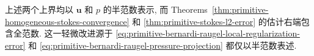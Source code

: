 \setcounter{statement}{1}
\begin{Remark}\label{rem:primitive-bernardi-raugel-seminorm-estimates}
上述两个上界均以 $\mathbf u$ 和 $p$ 的半范数表示, 而
Theorems~\ref{thm:primitive-homogeneous-stokes-convergence} 和
\ref{thm:primitive-stokes-l2-error} 的估计右端包含全范数.
这一轻微改进源于 \eqref{eq:primitive-bernardi-raugel-local-regularization-error}
和 \eqref{eq:primitive-bernardi-raugel-pressure-projection} 都仅以半范数表述.
\end{Remark}
